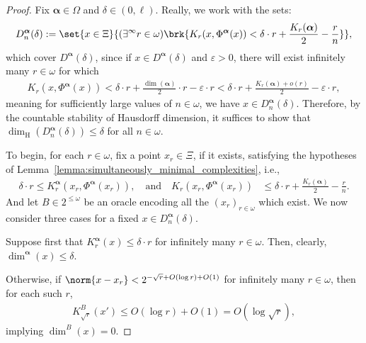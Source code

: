 \begin{proof}
    Fix $\boldsymbol{\alpha} \in \Omega$ and $\delta \in (0, \ell)$. Really, we work with the sets:
    \begin{align*}
        D^{\boldsymbol{\alpha}}_n(\delta) := \set{x \in \Xi}{(\exists^\infty r \in \omega) \brk{K_r(x, \Phi^{\boldsymbol{\alpha}}(x)) < \delta \cdot r + \frac{K_r(\boldsymbol{\alpha})}{2} - \frac{r}{n}}},
    \end{align*}
    which cover $D^{\boldsymbol{\alpha}}(\delta)$, since if $x \in D^{\boldsymbol{\alpha}}(\delta)$ and $\varepsilon > 0$, there will exist infinitely many $r \in \omega$ for which
    \begin{align*}
        K_r(x, \Phi^{\boldsymbol{\alpha}}(x)) < \delta \cdot r + \frac{\dim(\boldsymbol{\alpha})}{2}  \cdot r - \varepsilon \cdot r < \delta \cdot r + \frac{K_r(\boldsymbol{\alpha}) + o(r)}{2} - \varepsilon \cdot r,
    \end{align*}
    meaning for sufficiently large values of $n \in \omega$, we have $x \in D^{\boldsymbol{\alpha}}_n(\delta)$. Therefore, by the countable stability of Hausdorff dimension, it suffices to show that $\dim_{\operatorname{H}}(D^{\boldsymbol{\alpha}}_n(\delta)) \leq \delta$ for all $n \in \omega$.

    To begin, for each $r \in \omega$, fix a point $x_r \in \Xi$, if it exists, satisfying the hypotheses of Lemma~\ref{lemma:simultaneously_minimal_complexities}, i.e., 
    \begin{align*}
        \delta \cdot r \leq K_r^{\boldsymbol{\alpha}}(x_r, \Phi^{\boldsymbol{\alpha}}(x_r)), \quad \text{and} \quad K_r(x_r, \Phi^{\boldsymbol{\alpha}}(x_r)) &\leq \delta \cdot r + \frac{K_r(\boldsymbol{\alpha})}{2} - \frac{r}{n}.
    \end{align*}
    And let $B \in 2^{\leq\omega}$ be an oracle encoding all the $(x_r)_{r \in \omega}$ which exist. We now consider three cases for a fixed $x \in D^{\boldsymbol{\alpha}}_n(\delta)$. 

    Suppose first that $K^{\boldsymbol{\alpha}}_r(x) \leq \delta \cdot r$ for infinitely many $r \in \omega$. Then, clearly, $\dim^{\boldsymbol{\alpha}}(x) \leq \delta$. 
    
    Otherwise, if $\norm{x - x_r} < 2^{-\sqrt{r} + O(\log r) + O(1)}$ for infinitely many $r \in \omega$, then for each such $r$,
    \begin{align*}
        K^B_{\sqrt{r}}(x') \leq O(\log r) + O(1) = O(\log \sqrt{r}),
    \end{align*}
    implying $\dim^B(x) = 0$. 
    

\end{proof}

